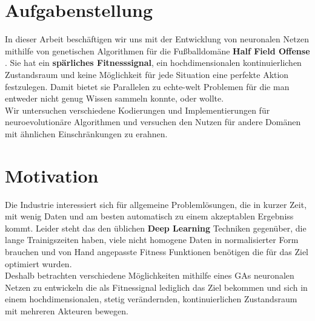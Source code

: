 \section{Aufgabenstellung}

In dieser Arbeit beschäftigen wir uns mit der Entwicklung von neuronalen Netzen mithilfe von genetischen Algorithmen für die Fußballdomäne \textbf{Half Field Offense} \cite{hfo}. Sie hat ein \textbf{spärliches Fitnesssignal}, ein hochdimensionalen kontinuierlichen Zustandsraum und keine Möglichkeit für jede Situation eine perfekte Aktion festzulegen. Damit bietet sie Parallelen zu echte-welt Problemen für die man entweder nicht genug Wissen sammeln konnte, oder wollte.  \\

\noindent
Wir untersuchen verschiedene Kodierungen und Implementierungen für neuroevolutionäre Algorithmen und versuchen den Nutzen für andere Domänen mit ähnlichen Einschränkungen zu erahnen.\\


\newpage
\section{Motivation}

Die Industrie interessiert sich für allgemeine Problemlösungen, die in kurzer Zeit, mit wenig Daten und am besten automatisch zu einem akzeptablen Ergebniss kommt. Leider steht das den üblichen \textbf{Deep Learning} Techniken gegenüber, die lange Trainigszeiten haben, viele nicht homogene Daten in normalisierter Form brauchen und von Hand angepasste Fitness Funktionen benötigen die für das Ziel optimiert wurden. \\

\noindent
Deshalb betrachten verschiedene Möglichkeiten mithilfe eines GAs neuronalen Netzen zu entwickeln die als Fitnessignal lediglich das Ziel bekommen und sich in einem hochdimensionalen, stetig verändernden, kontinuierlichen Zustandsraum mit mehreren Akteuren bewegen.


